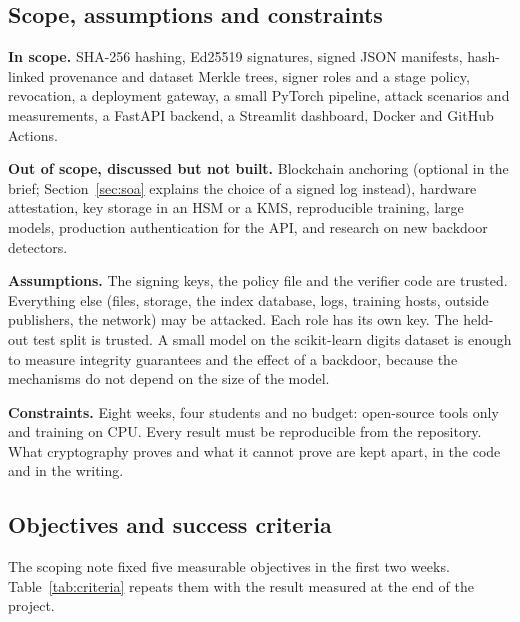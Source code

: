 \subsection{Scope, assumptions and constraints}
\textbf{In scope.} SHA-256 hashing, Ed25519 signatures, signed JSON manifests, hash-linked provenance and
dataset Merkle trees, signer roles and a stage policy, revocation, a deployment gateway, a small PyTorch
pipeline, attack scenarios and measurements, a FastAPI backend, a Streamlit dashboard, Docker and GitHub
Actions.

\textbf{Out of scope, discussed but not built.} Blockchain anchoring (optional in the brief; Section~\ref{sec:soa}
explains the choice of a signed log instead), hardware attestation, key storage in an HSM or a KMS,
reproducible training, large models, production authentication for the API, and research on new backdoor
detectors.

\textbf{Assumptions.} The signing keys, the policy file and the verifier code are trusted. Everything else
(files, storage, the index database, logs, training hosts, outside publishers, the network) may be attacked.
Each role has its own key. The held-out test split is trusted. A small model on the scikit-learn digits dataset
is enough to measure integrity guarantees and the effect of a backdoor, because the mechanisms do not depend on
the size of the model.

\textbf{Constraints.} Eight weeks, four students and no budget: open-source tools only and training on CPU.
Every result must be reproducible from the repository. What cryptography proves and what it cannot prove are
kept apart, in the code and in the writing.

\subsection{Objectives and success criteria}
The scoping note fixed five measurable objectives in the first two weeks. Table~\ref{tab:criteria} repeats
them with the result measured at the end of the project.


